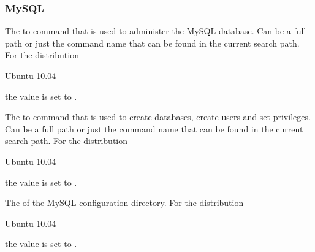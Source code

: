 \subsubsection*{MySQL}


The  to  command that is used to administer the 
MySQL database. Can be a full path or
just the command name that can be found in the current search path. 
For the distribution
\begin{inparaitem}
\item[\TheDistribution{ubuntu}] Ubuntu 10.04
\end{inparaitem}
the value is set to .


The  to  command that is used to create databases,
create users and set privileges. Can be a full path or
just the command name that can be found in the current search path. 
For the distribution
\begin{inparaitem}
\item[\TheDistribution{ubuntu}] Ubuntu 10.04
\end{inparaitem}
the value is set to .


The  of the MySQL configuration directory.
For the distribution
\begin{inparaitem}
\item[\TheDistribution{ubuntu}] Ubuntu 10.04
\end{inparaitem}
the value is set to .


